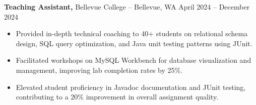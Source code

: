 \documentclass[11pt]{article}       %
\begin{document}

\textbf{Teaching Assistant,} {Bellevue College} -- Bellevue, WA \hfill April 2024 -- December 2024 \\
\vspace{-9pt}
\begin{itemize}
  \item Provided in-depth technical coaching to 40+ students on relational schema design, SQL query optimization, and Java unit testing patterns using JUnit.
  \item Facilitated workshops on MySQL Workbench for database visualization and management, improving lab completion rates by 25\%.
  \item Elevated student proficiency in Javadoc documentation and JUnit testing, contributing to a 20\% improvement in overall assignment quality.
\end{itemize}

\end{document}
